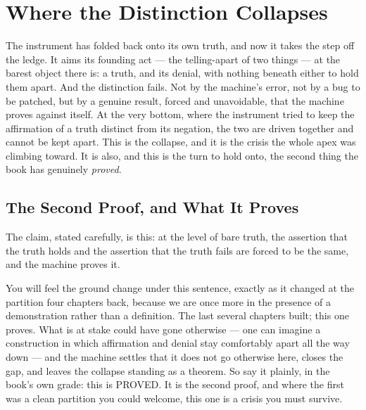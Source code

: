 \chapter{Where the Distinction Collapses}

The instrument has folded back onto its own truth, and now it takes the step off the ledge. It aims its founding
act --- the telling-apart of two things --- at the barest object there is: a truth, and its denial, with nothing
beneath either to hold them apart. And the distinction fails. Not by the machine's error, not by a bug to be
patched, but by a genuine result, forced and unavoidable, that the machine proves against itself. At the very
bottom, where the instrument tried to keep the affirmation of a truth distinct from its negation, the two are
driven together and cannot be kept apart. This is the collapse, and it is the crisis the whole apex was climbing
toward. It is also, and this is the turn to hold onto, the second thing the book has genuinely \emph{proved}.

\section{The Second Proof, and What It Proves}

The claim, stated carefully, is this: at the level of bare truth, the assertion that the truth holds and the
assertion that the truth fails are forced to be the same, and the machine proves it.

You will feel the ground change under this sentence, exactly as it changed at the partition four chapters back,
because we are once more in the presence of a demonstration rather than a definition. The last several chapters
built; this one proves. What is at stake could have gone otherwise --- one can imagine a construction in which
affirmation and denial stay comfortably apart all the way down --- and the machine settles that it does not go
otherwise here, closes the gap, and leaves the collapse standing as a theorem. So say it plainly, in the book's
own grade: this is PROVED. It is the second proof, and where the first was a clean partition you could welcome,
this one is a crisis you must survive.

